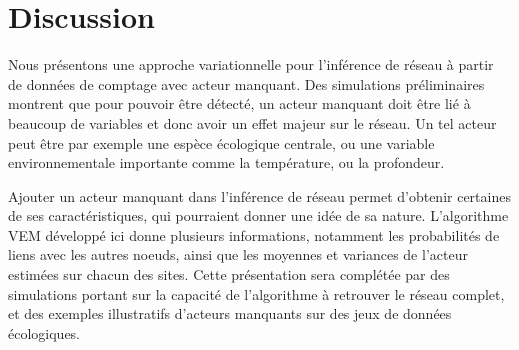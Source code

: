 \section{Discussion}
Nous présentons une approche variationnelle pour l'inférence de réseau à partir de données de comptage avec acteur manquant. Des simulations préliminaires montrent que pour pouvoir être détecté, un acteur manquant doit être lié à beaucoup de variables et donc avoir un effet majeur sur le réseau. Un tel acteur peut être par exemple une espèce écologique centrale, ou une variable environnementale importante comme la température, ou la profondeur.

Ajouter un acteur manquant dans l'inférence de réseau permet d'obtenir certaines de ses caractéristiques, qui pourraient donner une idée de sa nature. L'algorithme VEM développé ici donne plusieurs informations, notamment les  probabilités de liens avec les autres noeuds, ainsi que les moyennes et variances de l'acteur estimées sur chacun des sites. Cette présentation sera complétée par des simulations portant sur la capacité de l'algorithme à retrouver le réseau complet, et des exemples illustratifs d'acteurs manquants sur des jeux de données écologiques.
